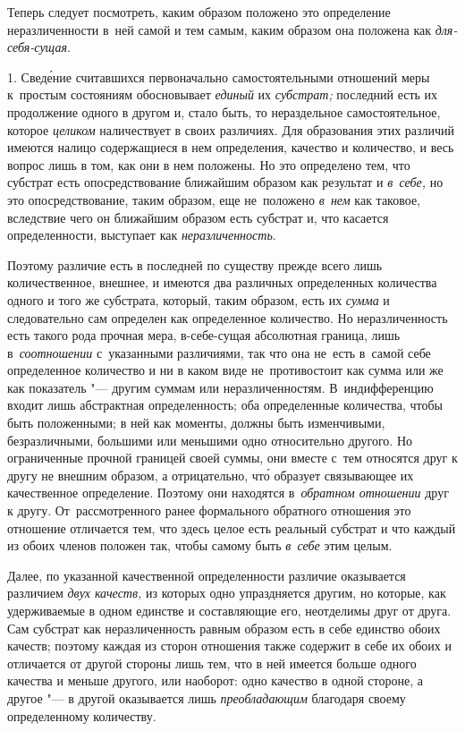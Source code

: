 
Теперь следует посмотреть, каким образом положено это определение
неразличенности в~ней самой и тем самым, каким образом она положена
как {\em для-себя-сущая}.

1. Свед\'{е}ние считавшихся первоначально самостоятельными отношений меры
к~простым состояниям обосновывает {\em единый} их {\em субстрат;} последний
есть их продолжение одного в другом и, стало быть, то нераздельное
самостоятельное, которое {\em целиком} наличествует в своих различиях.
Для образования этих различий имеются налицо содержащиеся в нем определения,
качество и количество, и весь вопрос лишь в том, как они в нем положены.
Но это определено тем, что субстрат есть опосредствование ближайшим образом
как результат и {\em в~себе,} но это опосредствование, таким образом, еще
не~положено {\em в~нем} как таковое, вследствие чего он ближайшим образом есть
субстрат и, что касается определенности, выступает как {\em неразличенность}.

Поэтому различие есть в последней по существу прежде всего лишь количественное,
внешнее, и имеются два различных определенных количества одного и того же
субстрата, который, таким образом, есть их {\em сумма} и следовательно сам
определен как определенное количество. Но неразличенность есть такого рода
прочная мера, в-себе-сущая абсолютная граница, лишь в~{\em соотношении}
с~указанными различиями, так что она не~есть в~самой себе определенное
количество и ни в каком виде не~противостоит как сумма или же как
показатель "--- другим суммам или неразличенностям. В~индифференцию входит
лишь абстрактная определенность; оба определенные количества, чтобы быть
положенными; в ней как моменты, должны быть изменчивыми, безразличными,
большими или меньшими одно относительно другого. Но ограниченные прочной
границей своей суммы, они вместе с~тем относятся друг к другу не внешним
образом, а отрицательно, чт\'{о} образует связывающее их качественное
определение. Поэтому они находятся в~{\em обратном отношении} друг к другу.
От~рассмотренного ранее формального обратного отношения это отношение
отличается тем, что здесь целое есть реальный субстрат и что каждый из обоих
членов положен так, чтобы самому быть {\em в~себе} этим целым.

Далее, по указанной качественной определенности различие оказывается различием
{\em двух качеств,} из которых одно упраздняется другим, но которые, как
удерживаемые в одном единстве и составляющие его, неотделимы друг от друга. Сам
субстрат как неразличенность равным образом есть в себе единство обоих качеств;
поэтому каждая из сторон отношения также содержит в себе их обоих и отличается
от другой стороны лишь тем, что в ней имеется больше одного качества и меньше
другого, или наоборот: одно качество в одной стороне, а другое "--- в другой
оказывается лишь {\em преобладающим} благодаря своему определенному количеству.

